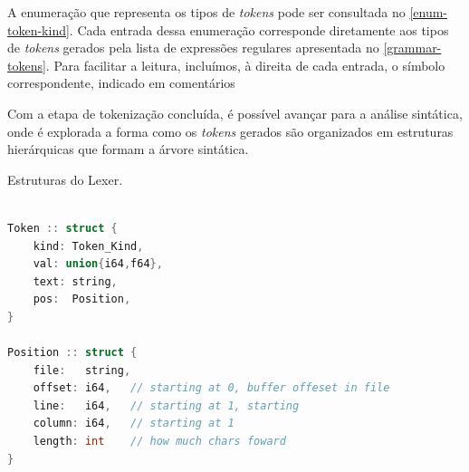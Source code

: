 A enumeração que representa os tipos de \textit{tokens} pode ser consultada no \autoref{enum-token-kind}. Cada entrada dessa enumeração corresponde diretamente aos tipos de \textit{tokens} gerados pela lista de expressões regulares apresentada no \autoref{grammar-tokens}. Para facilitar a leitura, incluímos, à direita de cada entrada, o símbolo correspondente, indicado em comentários

Com a etapa de tokenização concluída, é possível avançar para a análise sintática, onde é explorada a forma como os \textit{tokens} gerados são organizados em estruturas hierárquicas que formam a árvore sintática.

\begin{codigo}[H]
        \caption{\small Estruturas do Lexer. }
        \label{lexer-structs}
\begin{lstlisting}[language=C++]

Token :: struct {
    kind: Token_Kind,
    val: union{i64,f64},
    text: string,
    pos:  Position,
}

Position :: struct {
    file:   string,
    offset: i64,   // starting at 0, buffer offeset in file
    line:   i64,   // starting at 1, starting
    column: i64,   // starting at 1
    length: int    // how much chars foward
}
    
  \end{lstlisting}
\end{codigo}


